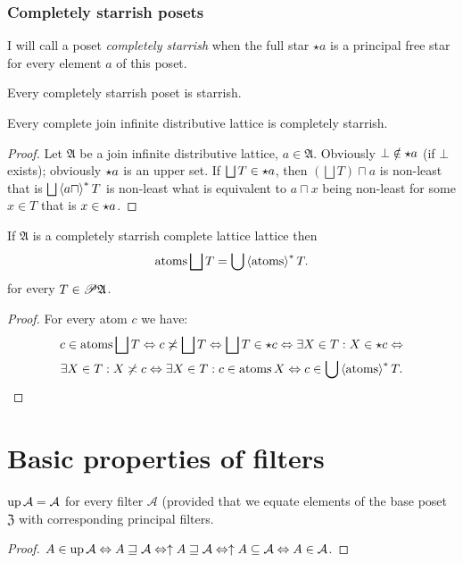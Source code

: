 \subsubsection{Completely starrish posets}
\begin{defn}
I will call a poset \emph{completely starrish}
when the full star $\star a$ is a principal free star for every element
$a$ of this poset.\end{defn}
\begin{obvious}
Every completely starrish poset is starrish.\end{obvious}
\begin{prop}
Every complete join infinite distributive lattice is completely starrish.\end{prop}
\begin{proof}
Let $\mathfrak{A}$ be a join infinite distributive lattice, $a\in\mathfrak{A}$.
Obviously $\bot\notin\star a$ (if $\bot$ exists); obviously
$\star a$ is an upper set. If $\bigsqcup T\in\fullstar a$, then
$\left(\bigsqcup T\right)\sqcap a$ is non-least that is $\bigsqcup\rsupfun{a\sqcap}T$
is non-least what is equivalent to $a\sqcap x$ being non-least for
some $x\in T$ that is $x\in\star a$.\end{proof}
\begin{thm}
If $\mathfrak{A}$ is a completely starrish complete lattice lattice
then
\[
\atoms\bigsqcup T=\bigcup\rsupfun{\atoms}T.
\]
for every $T\in\mathscr{P}\mathfrak{A}$.\end{thm}
\begin{proof}
For every atom $c$ we have:
\begin{multline*}
c\in\atoms\bigsqcup T\Leftrightarrow c\nasymp\bigsqcup T\Leftrightarrow\bigsqcup T\in\fullstar c\Leftrightarrow\exists X\in T:X\in\fullstar c\Leftrightarrow\\
\exists X\in T:X\nasymp c\Leftrightarrow\exists X\in T:c\in\atoms X\Leftrightarrow c\in\bigcup\rsupfun{\atoms}T.
\end{multline*}

\end{proof}

\section{Basic properties of filters}
\begin{prop}
$\operatorname{up}\mathcal{A}=\mathcal{A}$ for every filter $\mathcal{A}$ (provided
that we equate elements of the base poset~$\mathfrak{Z}$ with corresponding
principal filters.\end{prop}
\begin{proof}
$A\in\operatorname{up}\mathcal{A}\Leftrightarrow A\sqsupseteq\mathcal{A}\Leftrightarrow\uparrow A\sqsupseteq\mathcal{A}\Leftrightarrow\uparrow A\subseteq\mathcal{A}\Leftrightarrow A\in\mathcal{A}$.
\end{proof}

